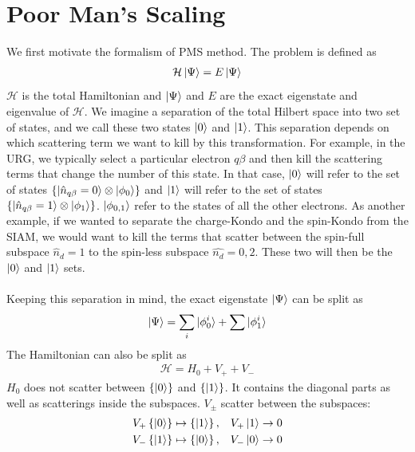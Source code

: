 \documentclass[twoside]{report}
\numberwithin{equation}{section}
\begin{document}
\section{Poor Man's Scaling}
We first motivate the formalism of PMS method. The problem is defined as
\begin{equation}\begin{aligned}
	\label{problem}
\mathcal{H}\ket{\Psi} = E\ket{\Psi}
\end{aligned}\end{equation}
\(\mathcal{H}\) is the total Hamiltonian and \(\ket{\Psi}\) and \(E\) are the exact eigenstate and eigenvalue of \(\mathcal{H}\). We imagine a separation of the total Hilbert space into two set of states, and we call these two states \(\ket{0}\) and \(\ket{1}\). This separation depends on which scattering term we want to kill by this transformation. For example, in the URG, we typically select a particular electron \(q\beta\) and then kill the  scattering terms that change the number of this state. In that case, \(\ket{0}\) will refer to the set of states \(\left\{\ket{\hat n_{q\beta}=0}\otimes\ket{\phi_0}\right\}\) and \(\ket{1}\) will refer to the set of states \(\left\{\ket{\hat n_{q\beta}=1}\otimes\ket{\phi_1}\right\}\). \(\ket{\phi_{0,1}}\) refer to the states of all the other electrons. As another example, if we wanted to separate the charge-Kondo and the spin-Kondo from the SIAM, we would want to kill the terms that scatter between the spin-full subspace \(\hat n_d=1\) to the spin-less subspace \(\hat{n_d}=0,2\). These two will then be the \(\ket{0}\) and \(\ket{1}\) sets. 
\\\\Keeping this separation in mind, the exact eigenstate \(\ket{\Psi}\) can be split as 
\begin{equation}\begin{aligned}
\ket{\Psi} = \sum_i \ket{\phi_0^i} + \sum \ket{\phi_1^i}
\end{aligned}\end{equation}
The Hamiltonian can also be split as 
\begin{equation}\begin{aligned}
\mathcal{H} = H_0 + V_+ + V_-
\end{aligned}\end{equation}
\(H_0\) does not scatter between \(\left\{\ket{0}\right\}\) and \(\left\{\ket{1}\right\}\). It contains the diagonal parts as well as scatterings inside the subspaces. \(V_\pm\) scatter between the subspaces:
\begin{equation}\begin{aligned}
V_+ \left\{\ket{0}\right\} \mapsto \left\{\ket{1}\right\},&& V_+ \ket{1} \to 0\\
V_- \left\{\ket{1}\right\} \mapsto \left\{\ket{0}\right\},&& V_- \ket{0} \to 0
\end{aligned}\end{equation}
\end{document}
